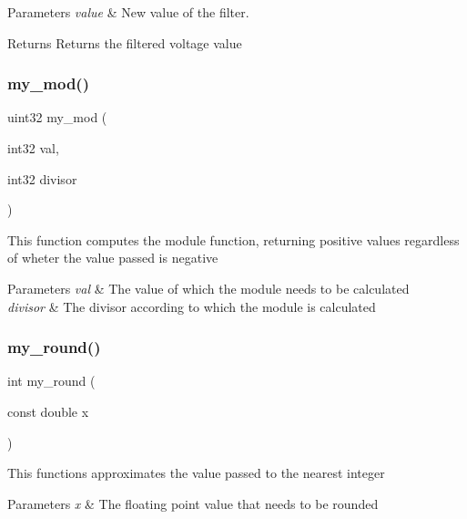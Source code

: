 \begin{DoxyParams}{Parameters}
{\em value} & New value of the filter.\\
\hline
\end{DoxyParams}
\begin{DoxyReturn}{Returns}
Returns the filtered voltage value 
\end{DoxyReturn}
\mbox{\label{utils_8c_a01d3bb6c1fd469a6c530fb296e4fe0fe}} 
\subsubsection{my\+\_\+mod()}
{\footnotesize\ttfamily uint32 my\+\_\+mod (\begin{DoxyParamCaption}\item[{int32}]{val,  }\item[{int32}]{divisor }\end{DoxyParamCaption})}

This function computes the module function, returning positive values regardless of wheter the value passed is negative


\begin{DoxyParams}{Parameters}
{\em val} & The value of which the module needs to be calculated \\
\hline
{\em divisor} & The divisor according to which the module is calculated \\
\hline
\end{DoxyParams}
\mbox{\label{utils_8c_a1ea4108a2c530470624ce2678e65dcef}} 
\subsubsection{my\+\_\+round()}
{\footnotesize\ttfamily int my\+\_\+round (\begin{DoxyParamCaption}\item[{const double}]{x }\end{DoxyParamCaption})}

This functions approximates the value passed to the nearest integer


\begin{DoxyParams}{Parameters}
{\em x} & The floating point value that needs to be rounded \\
\hline
\end{DoxyParams}

